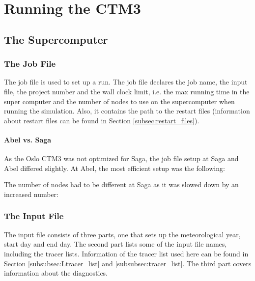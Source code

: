 \cleardoublepage

\chapter{Running the CTM3}\label{app:running_CTM3}

\section{The Supercomputer}\label{app:supercomputer}

\subsection{The Job File}

The job file is used to set up a run. The job file declares the job name, the input file, the project number and the wall clock limit, i.e. the max running time in the super computer and the number of nodes to use on the supercomputer when running the simulation. Also, it contains the path to the restart files (information about restart files can be found in Section \ref{subsec:restart_files}).

\subsubsection{Abel vs. Saga}

As the Oslo CTM3 was not optimized for Saga, the job file setup at Saga and Abel differed slightly. At Abel, the most efficient setup was the following: 



The number of nodes had to be different at Saga as it was slowed down by an increased number: 



\subsection{The Input File}

The input file consists of three parts, one that sets up the meteorological year, start day and end day. The second part lists some of the input file names, including the tracer lists. Information of the tracer list used here can be found in Section \ref{subsubsec:Ltracer_list} and \ref{subsubsec:tracer_list}. The third part covers information about the diagnostics. 

\medskip

